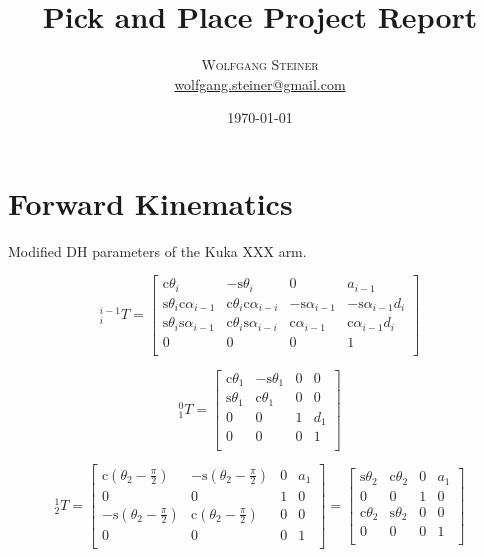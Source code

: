 \documentclass[twoside]{article}
\title{Pick and Place Project Report} %
\author{%
\textsc{Wolfgang Steiner} \\[0.5ex] %
\normalsize \href{mailto:wolfgang.steiner@gmail.com}{wolfgang.steiner@gmail.com} %
}
\date{\today} %
\renewcommand{\c}{\text{c}}
\newcommand{\s}{\text{s}}
\newcommand{\pihalf}{\frac{\pi}{2}}
\newcommand{\T}[2]{\mbox{$_{#2}^{#1}{T}$}}
\begin{document}
\maketitle


\section{Forward Kinematics}
\begin{table}[ht]
\caption{Modified DH parameters of the Kuka XXX arm.}
\label{tab:dh-parameters}

\end{table}

$$ \T{i-1}{i} =
\begin{bmatrix}
  \c\theta_i & -\s\theta_i & 0 & a_{i-1} \\
  \s\theta_i\c\alpha_{i-1} & \c\theta_i\c\alpha_{i-i} & -\s\alpha_{i-1} & -\s\alpha_{i-1}d_i \\
  \s\theta_i\s\alpha_{i-1} & \c\theta_i\s\alpha_{i-i} &  \c\alpha_{i-1} &  \c\alpha_{i-1}d_i \\
  0 & 0 & 0 & 1\\
\end{bmatrix}
$$

$$ \T{0}{1} =
  \begin{bmatrix}
    \c\theta_1 & -\s\theta_1 & 0 & 0 \\
    \s\theta_1 &  \c\theta_1 & 0 & 0 \\
            0 &          0 & 1 & d_1 \\
            0 &          0 & 0 & 1 \\
  \end{bmatrix} $$



$$ \T{1}{2} =
\begin{bmatrix}
\c(\theta_2 - \pihalf) & -\s(\theta_2 - \pihalf) &  0 & a_1 \\
                     0 &                       0 &  1 &   0 \\
-\s(\theta_2 - \pihalf)&  \c(\theta_2 - \pihalf) &  0 &   0 \\
                     0 &                       0 &  0 &   1 \\
\end{bmatrix}
=
\begin{bmatrix}
\s\theta_2 &  \c\theta_2 & 0 & a_1 \\
         0 &           0 & 1 &   0 \\
\c\theta_2 &  \s\theta_2 & 0 &   0 \\
         0 &           0 & 0 &   1 \\
\end{bmatrix}
$$
\end{document}

